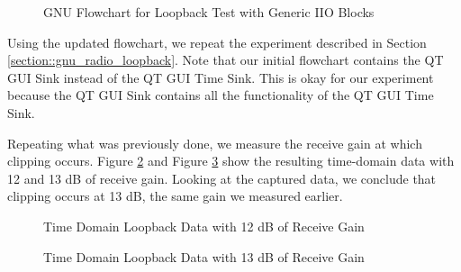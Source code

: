 \documentclass{article}
\begin{document}
\begin{figure}[H]
	\centerline{}
	\caption{GNU Flowchart for Loopback Test with Generic IIO Blocks}
	\label{fig::gnu_radio_loopback_generic_iio}
\end{figure}

Using the updated flowchart, we repeat the experiment described in Section \ref{section::gnu_radio_loopback}. Note that our initial flowchart contains the QT GUI Sink instead of the QT GUI Time Sink. This is okay for our experiment because the QT GUI Sink contains all the functionality of the QT GUI Time Sink.

Repeating what was previously done, we measure the receive gain at which clipping occurs. Figure \ref{fig::gnu_radio_loopback_generic_iio_rx_gain_12dB} and Figure 
\ref{fig::gnu_radio_loopback_generic_iio_rx_gain_13dB} show the resulting time-domain data with 12 and 13 dB of receive gain. Looking at the captured data, we conclude that clipping occurs at 13 dB, the same gain we measured earlier.
 
\begin{figure}[H]
	\centerline{}
	\caption{Time Domain Loopback Data with 12 dB of Receive Gain}
	\label{fig::gnu_radio_loopback_generic_iio_rx_gain_12dB}
\end{figure}

\begin{figure}[H]
	\centerline{}
	\caption{Time Domain Loopback Data with 13 dB of Receive Gain}
	\label{fig::gnu_radio_loopback_generic_iio_rx_gain_13dB}
\end{figure}
\end{document}
